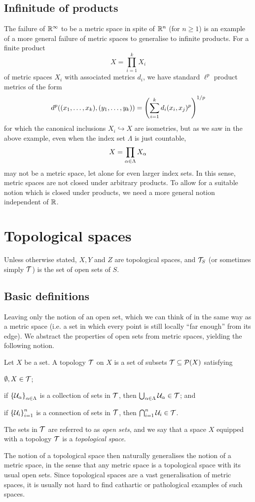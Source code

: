 \documentclass[11pt]{article}
\begin{document}
\subsection{Infinitude of products}
The failure of $\mathbb{R}^\infty$ to be a metric space in spite of $\mathbb{R}^n$ (for $n \geq 1$) is an example of a more general failure of metric spaces to generalise to infinite products. For a finite product 
$$
    X = \prod_{i = 1}^k X_i
$$
of metric spaces $X_i$ with associated metrics $d_i$, we have standard $\ell^p$ product metrics of the form
$$
    d^p((x_1, \ldots, x_k), (y_1, \ldots, y_k)) = \left(  \sum_{i = 1}^kd_i(x_i, x_j)^p  \right)^{1/p}
$$
for which the canonical inclusions $X_i \hookrightarrow X$ are isometries, but as we saw in the above example, even when the index set $\Lambda$ is just countable, $$
    X = \prod_{\alpha \in \Lambda} X_\alpha
$$
may not be a metric space, let alone for even larger index sets. In this sense, metric spaces are not closed under arbitrary products. To allow for a suitable notion which is closed under products, we need a more general notion independent of $\mathbb{R}$.
\section{Topological spaces}
Unless otherwise stated, $X, Y$ and $Z$ are topological spaces, and $\mathcal{T}_S$ (or sometimes simply $\mathcal{T}$) is the set of open sets of $S$.
\subsection{Basic definitions}
Leaving only the notion of an open set, which we can think of in the same way as a metric space (i.e. a set in which every point is still locally ``far enough'' from its edge). We abstract the properties of open sets from metric spaces, yielding the following notion.
\begin{definition}
    Let $X$ be a set. A topology $\mathcal{T}$ on $X$ is a set of subsets $\mathcal{T} \subseteq \mathcal{P}(X)$ satisfying
    \begin{enum}
        \item $\emptyset, X \in \mathcal{T}$;
        \item if $\left\{  \mathcal{U}_\alpha  \right\}_{\alpha \in \Lambda}$ is a collection of sets in $\mathcal{T}$, then $\bigcup_{\alpha \in \Lambda} \mathcal{U}_\alpha \in \mathcal{T}$; and
        \item if $\left\{  \mathcal{U}_i  \right\}_{i = 1}^n$ is a connection of sets in $\mathcal{T}$, then $\bigcap_{i = 1}^n \mathcal{U}_i \in \mathcal{T}$.
    \end{enum}
    The sets in $\mathcal{T}$ are referred to as \emph{open sets}, and we say that a space $X$ equipped with a topology $\mathcal{T}$ is a \emph{topological space}.
\end{definition}
The notion of a topological space then naturally generalises the notion of a metric space, in the sense that any metric space is a topological space with its usual open sets. Since topological spaces are a vast generalisation of metric spaces, it is usually not hard to find cathartic or pathological examples of such spaces.
\end{document}
